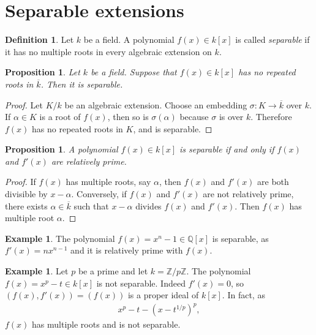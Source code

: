 \documentclass[12pt]{report}
\theoremstyle{plain}
\newtheorem{proposition}[theorem]{Proposition}
\theoremstyle{remark}
\theoremstyle{definition}
\newtheorem{definition}[theorem]{Definition}
\newtheorem{example}[theorem]{Example}
\newcommand{\Z}{\mathbb{Z}}
\newcommand{\Q}{\mathbb{Q}}
\begin{document}
\clearpage
\section{Separable extensions}
\begin{definition}
    Let $k$ be a field. A polynomial $f(x)\in k[x]$ is called \emph{separable} if it has no multiple roots in every algebraic extension on $k$.
\end{definition}

\begin{proposition}
    Let $k$ be a field. Suppose that $f(x)\in k[x]$ has no repeated roots in $\overline{k}$. Then it is separable.
\end{proposition}
\begin{proof}
    Let $K/k$ be an algebraic extension. Choose an embedding $\sigma:K\rightarrow \overline{k}$ over $k$. If $\alpha\in K$ is a root of $f(x)$, then so is $\sigma(\alpha)$ because $\sigma$ is over $k$. Therefore $f(x)$ has no repeated roots in $K$, and is separable.
\end{proof}

\begin{proposition}
    A polynomial $f(x)\in k[x]$ is separable if and only if $f(x)$ and $f'(x)$ are relatively prime.
\end{proposition}
\begin{proof}
    If $f(x)$ has multiple roots, say $\alpha$, then $f(x)$ and $f'(x)$ are both divisible by $x-\alpha$. Conversely, if $f(x)$ and $f'(x)$ are not relatively prime, there exists $\alpha\in\overline{k}$ such that $x-\alpha$ divides $f(x)$ and $f'(x)$. Then $f(x)$ has multiple root $\alpha$.
\end{proof}

\begin{example}
    The polynomial $f(x)=x^n-1\in\Q[x]$ is separable, as $f'(x)=nx^{n-1}$ and it is relatively prime with $f(x)$.
\end{example}

\begin{example}
    Let $p$ be a prime and let $k=\Z/p\Z$. The polynomial $f(x)=x^p-t\in k[x]$ is not separable. Indeed $f'(x)=0$, so $(f(x),f'(x))=(f(x))$ is a proper ideal of $k[x]$. In fact, as
    \begin{align*}
        x^p-t - (x-t^{1/p})^p,
    \end{align*}
    $f(x)$ has multiple roots and is not separable.
\end{example}
\end{document}
